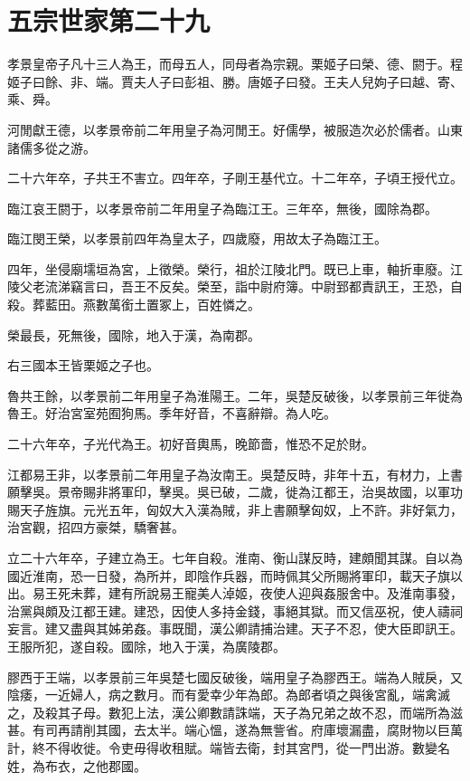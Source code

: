\chapter{五宗世家第二十九}

孝景皇帝子凡十三人為王，而母五人，同母者為宗親。栗姬子曰榮、德、閼于。程姬子曰餘、非、端。賈夫人子曰彭祖、勝。唐姬子曰發。王夫人兒姁子曰越、寄、乘、舜。

河閒獻王德，以孝景帝前二年用皇子為河閒王。好儒學，被服造次必於儒者。山東諸儒多從之游。

二十六年卒，子共王不害立。四年卒，子剛王基代立。十二年卒，子頃王授代立。

臨江哀王閼于，以孝景帝前二年用皇子為臨江王。三年卒，無後，國除為郡。

臨江閔王榮，以孝景前四年為皇太子，四歲廢，用故太子為臨江王。

四年，坐侵廟壖垣為宮，上徵榮。榮行，祖於江陵北門。既已上車，軸折車廢。江陵父老流涕竊言曰，吾王不反矣。榮至，詣中尉府簿。中尉郅都責訊王，王恐，自殺。葬藍田。燕數萬銜土置冢上，百姓憐之。

榮最長，死無後，國除，地入于漢，為南郡。

右三國本王皆栗姬之子也。

魯共王餘，以孝景前二年用皇子為淮陽王。二年，吳楚反破後，以孝景前三年徙為魯王。好治宮室苑囿狗馬。季年好音，不喜辭辯。為人吃。

二十六年卒，子光代為王。初好音輿馬，晚節嗇，惟恐不足於財。

江都易王非，以孝景前二年用皇子為汝南王。吳楚反時，非年十五，有材力，上書願擊吳。景帝賜非將軍印，擊吳。吳已破，二歲，徙為江都王，治吳故國，以軍功賜天子旌旗。元光五年，匈奴大入漢為賊，非上書願擊匈奴，上不許。非好氣力，治宮觀，招四方豪桀，驕奢甚。

立二十六年卒，子建立為王。七年自殺。淮南、衡山謀反時，建頗聞其謀。自以為國近淮南，恐一日發，為所并，即陰作兵器，而時佩其父所賜將軍印，載天子旗以出。易王死未葬，建有所說易王寵美人淖姬，夜使人迎與姦服舍中。及淮南事發，治黨與頗及江都王建。建恐，因使人多持金錢，事絕其獄。而又信巫祝，使人禱祠妄言。建又盡與其姊弟姦。事既聞，漢公卿請捕治建。天子不忍，使大臣即訊王。王服所犯，遂自殺。國除，地入于漢，為廣陵郡。

膠西于王端，以孝景前三年吳楚七國反破後，端用皇子為膠西王。端為人賊戾，又陰痿，一近婦人，病之數月。而有愛幸少年為郎。為郎者頃之與後宮亂，端禽滅之，及殺其子母。數犯上法，漢公卿數請誅端，天子為兄弟之故不忍，而端所為滋甚。有司再請削其國，去太半。端心慍，遂為無訾省。府庫壞漏盡，腐財物以巨萬計，終不得收徙。令吏毋得收租賦。端皆去衛，封其宮門，從一門出游。數變名姓，為布衣，之他郡國。

